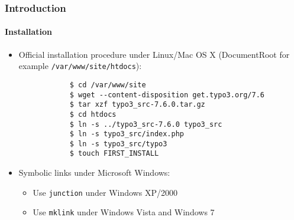 \begin{frame}[fragile]
	\frametitle{Introduction}
	\framesubtitle{Installation}

	\begin{itemize}
		\item Official installation procedure under Linux/Mac OS X\newline
			(DocumentRoot for example \texttt{/var/www/site/htdocs}):
		\begin{lstlisting}
			$ cd /var/www/site
			$ wget --content-disposition get.typo3.org/7.6
			$ tar xzf typo3_src-7.6.0.tar.gz
			$ cd htdocs
			$ ln -s ../typo3_src-7.6.0 typo3_src
			$ ln -s typo3_src/index.php
			$ ln -s typo3_src/typo3
			$ touch FIRST_INSTALL
		\end{lstlisting}

		\item Symbolic links under Microsoft Windows:

			\begin{itemize}
				\item Use \texttt{junction} under Windows XP/2000
				\item Use \texttt{mklink} under Windows Vista and Windows 7
			\end{itemize}

	\end{itemize}
\end{frame}

